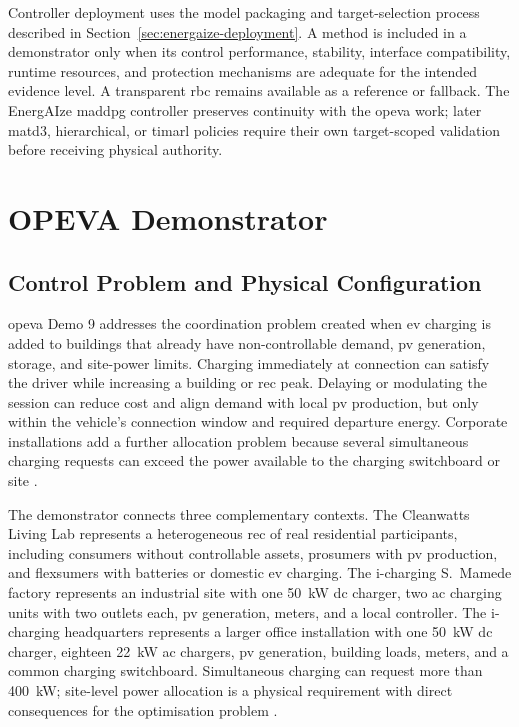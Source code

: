 Controller deployment uses the model packaging and target-selection process described in Section~\ref{sec:energaize-deployment}. A method is included in a demonstrator only when its control performance, stability, interface compatibility, runtime resources, and protection mechanisms are adequate for the intended evidence level. A transparent \gls{rbc} remains available as a reference or fallback. The EnergAIze \gls{maddpg} controller preserves continuity with the \gls{opeva} work; later \gls{matd3}, hierarchical, or \gls{timarl} policies require their own target-scoped validation before receiving physical authority.

\section{OPEVA Demonstrator}
\label{sec:opeva-demonstrator}

\subsection{Control Problem and Physical Configuration}
\label{sec:opeva-configuration}

\gls{opeva} Demo 9 addresses the coordination problem created when \gls{ev} charging is added to buildings that already have non-controllable demand, \gls{pv} generation, storage, and site-power limits. Charging immediately at connection can satisfy the driver while increasing a building or \gls{rec} peak. Delaying or modulating the session can reduce cost and align demand with local \gls{pv} production, but only within the vehicle's connection window and required departure energy. Corporate installations add a further allocation problem because several simultaneous charging requests can exceed the power available to the charging switchboard or site \parencite{opeva2026d63}.

The demonstrator connects three complementary contexts. The Cleanwatts Living Lab represents a heterogeneous \gls{rec} of real residential participants, including consumers without controllable assets, prosumers with \gls{pv} production, and flexsumers with batteries or domestic \gls{ev} charging. The i-charging S.~Mamede factory represents an industrial site with one \SI{50}{\kilo\watt} \gls{dc} charger, two \gls{ac} charging units with two outlets each, \gls{pv} generation, meters, and a local controller. The i-charging headquarters represents a larger office installation with one \SI{50}{\kilo\watt} \gls{dc} charger, eighteen \SI{22}{\kilo\watt} \gls{ac} chargers, \gls{pv} generation, building loads, meters, and a common charging switchboard. Simultaneous charging can request more than \SI{400}{\kilo\watt}; site-level power allocation is a physical requirement with direct consequences for the optimisation problem \parencite{opeva2026d63}.

